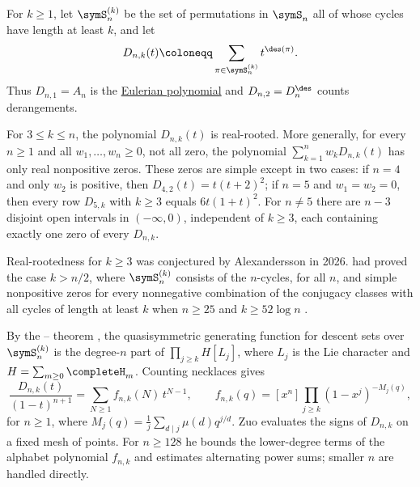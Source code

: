\begin{example*}
\label{longCycleDescentsRealRooted}
For $k\geq1$, let $\symS_n^{(k)}$ be the set of permutations in $\symS_n$
all of whose cycles have length at least $k$, and let
\[
  D_{n,k}(t)\coloneqq\sum_{\pi\in\symS_n^{(k)}}t^{\des(\pi)}.
\]
Thus $D_{n,1}=A_n$ is the \hyperref[eulerianPolynomial]{Eulerian
polynomial} and $D_{n,2}=D_n^{\des}$ counts derangements.

\begin{theorem}
\label{conjLongCycleDescents}
For $3\leq k\leq n$, the polynomial $D_{n,k}(t)$ is real-rooted.  More
generally, for every $n\geq1$ and all $w_1,\dotsc,w_n\geq0$, not all zero,
the polynomial $\sum_{k=1}^nw_kD_{n,k}(t)$ has only real nonpositive zeros.
These zeros are simple except in two cases: if $n=4$ and only $w_2$ is
positive, then $D_{4,2}(t)=t(t+2)^2$; if $n=5$ and $w_1=w_2=0$, then every
row $D_{5,k}$ with $k\geq3$ equals $6t(1+t)^2$.  For $n\neq5$ there are
$n-3$ disjoint open intervals in $(-\infty,0)$, independent of $k\geq3$,
each containing exactly one zero of every $D_{n,k}$.
\end{theorem}

Real-rootedness for $k\geq3$ was conjectured by Alexandersson in 2026.
 had proved the
case $k\gt n/2$, where $\symS_n^{(k)}$ consists of the $n$-cycles, for all
$n$, and simple nonpositive zeros for every nonnegative combination of the
conjugacy classes with all cycles of length at least $k$ when $n\geq25$ and
$k\geq52\log n$ \cite{ProgramComputer2026LongCycleDescents}.

By the -- theorem
\cite[Thm.~3.6]{GesselReutenauer1993}, the quasisymmetric generating
function for descent sets over $\symS_n^{(k)}$ is the degree-$n$ part of
$\prod_{j\geq k}H[L_j]$, where $L_j$ is the Lie character and
$H=\sum_{m\geq0}\completeH_m$.  Counting necklaces gives
\[
  \frac{D_{n,k}(t)}{(1-t)^{n+1}}=\sum_{N\geq1}f_{n,k}(N)\,t^{N-1},
  \qquad
  f_{n,k}(q)=[x^n]\prod_{j\geq k}(1-x^j)^{-M_j(q)},
\]
for $n\geq1$, where $M_j(q)=\frac1j\sum_{d\mid j}\mu(d)q^{j/d}$.
Zuo evaluates the signs of $D_{n,k}$ on a fixed mesh of points.  For
$n\geq128$ he bounds the lower-degree terms of the alphabet polynomial
$f_{n,k}$ and estimates alternating power sums; smaller $n$ are handled
directly.


\end{example*}
